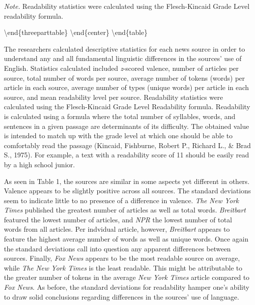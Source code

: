 \documentclass[english,,man]{apa6}
\begin{document}
\begin{tablenotes}[para]
\normalsize{\textit{Note.} Readability statistics were calculated using the Flesch-Kincaid Grade Level readability formula.}
\end{tablenotes}

\textbackslash{}end\{threeparttable\}
\textbackslash{}end\{center\}
\textbackslash{}end\{table\}

The researchers calculated descriptive statistics for each news source in order to understand any and all fundamental linguistic differences in the sources' use of English. Statistics calculated included \emph{z}-scored valence, number of articles per source, total number of words per source, average number of tokens (words) per article in each source, average number of types (unique words) per article in each source, and mean readability level per source. Readability statistics were calculated using the Flesch-Kincaid Grade Level Readability formula. Readability is calculated using a formula where the total number of syllables, words, and sentences in a given passage are determinants of its difficulty. The obtained value is intended to match up with the grade level at which one should be able to comfortably read the passage (Kincaid, Fishburne, Robert P., Richard L., \& Brad S., 1975). For example, a text with a readability score of 11 should be easily read by a high school junior.

As seen in Table 1, the sources are similar in some aspects yet different in others. Valence appears to be slightly positive across all sources. The standard deviations seem to indicate little to no presence of a difference in valence.
\emph{The New York Times} published the greatest number of articles as well as total words. \emph{Breitbart} featured the lowest number of articles, and \emph{NPR} the lowest number of total words from all articles. Per indvidual article, however, \emph{Breitbart} appears to feature the highest average number of words as well as unique words. Once again the standard deviations call into question any apparent differences between sources. Finally, \emph{Fox News} appears to be the most readable source on average, while \emph{The New York Times} is the least readable. This might be attributable to the greater number of tokens in the average \emph{New York Times} article compared to \emph{Fox News}. As before, the standard deviations for readability hamper one's ability to draw solid conclusions regarding differences in the sources' use of language.
\end{document}
